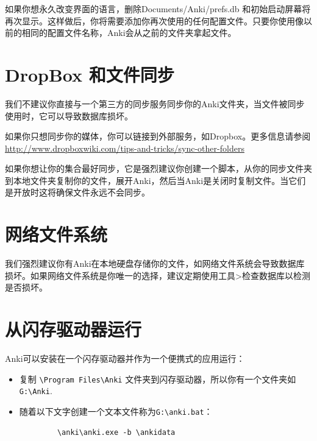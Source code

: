 \documentclass[a4paper]{book}
\begin{document}
		
		\begin{shaded}
			如果你想永久改变界面的语言，删除Documents/Anki/prefs.db 和初始启动屏幕将再次显示。这样做后，你将需要添加你再次使用的任何配置文件。只要你使用像以前的相同的配置文件名称，Anki会从之前的文件夹拿起文件。
		\end{shaded}
		
		\section{DropBox 和文件同步}
		
		我们不建议你直接与一个第三方的同步服务同步你的Anki文件夹，当文件被同步使用时，它可以导致数据库损坏。
		
		如果你只想同步你的媒体，你可以链接到外部服务，如Dropbox。更多信息请参阅
		\url{http://www.dropboxwiki.com/tips-and-tricks/sync-other-folders}
		
		如果你想让你的集合最好同步，它是强烈建议你创建一个脚本，从你的同步文件夹到本地文件夹复制你的文件，展开Anki，然后当Anki是关闭时复制文件。当它们是开放时这将确保文件永远不会同步。
		
		\section{网络文件系统}
		
		我们强烈建议你有Anki在本地硬盘存储你的文件，如网络文件系统会导致数据库损坏。如果网络文件系统是你唯一的选择，建议定期使用工具>检查数据库以检测是否损坏。
		
		\section{从闪存驱动器运行}
		
		Anki可以安装在一个闪存驱动器并作为一个便携式的应用运行：
		
		\begin{itemize}
			\itemsep1pt\parskip0pt
			\item 复制 \verb|\Program Files\Anki| 文件夹到闪存驱动器，所以你有一个文件夹如 \verb|G:\Anki|.
			\item 随着以下文字创建一个文本文件称为\verb|G:\anki.bat|：
		\end{itemize}
		
		\begin{shaded}\begin{verbatim}
			\anki\anki.exe -b \ankidata
			\end{verbatim}\end{shaded}
		
\end{document}
